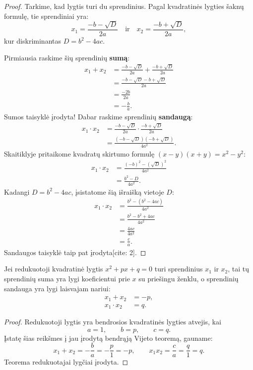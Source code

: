 \documentclass[11pt,a4paper]{scrartcl}
\begin{document}
\begin{proof}
Tarkime, kad lygtis turi du sprendinius. Pagal kvadratinės lygties šaknų formulę, tie sprendiniai yra:
\[ x_1 = \frac{-b - \sqrt{D}}{2a} \quad \text{ir} \quad x_2 = \frac{-b + \sqrt{D}}{2a}, \]
kur diskriminantas $D = b^2 - 4ac$.

Pirmiausia raskime šių sprendinių \textbf{sumą}:
\[
\begin{aligned}
x_1 + x_2 &= \frac{-b - \sqrt{D}}{2a} + \frac{-b + \sqrt{D}}{2a} \\
&= \frac{-b - \sqrt{D} - b + \sqrt{D}}{2a} \\
&= \frac{-2b}{2a} \\
&= -\frac{b}{a}.
\end{aligned}
\]
Sumos taisyklė įrodyta! Dabar raskime sprendinių \textbf{sandaugą}:
\[
\begin{aligned}
x_1 \cdot x_2 &= \frac{-b - \sqrt{D}}{2a} \cdot \frac{-b + \sqrt{D}}{2a} \\
&= \frac{(-b - \sqrt{D})(-b + \sqrt{D})}{4a^2}.
\end{aligned}
\]
Skaitiklyje pritaikome kvadratų skirtumo formulę $(x-y)(x+y) = x^2 - y^2$:
\[
\begin{aligned}
x_1 \cdot x_2 &= \frac{(-b)^2 - (\sqrt{D})^2}{4a^2} \\
&= \frac{b^2 - D}{4a^2}.
\end{aligned}
\]
Kadangi $D = b^2 - 4ac$, įsistatome šią išraišką vietoje $D$:
\[
\begin{aligned}
x_1 \cdot x_2 &= \frac{b^2 - (b^2 - 4ac)}{4a^2} \\
&= \frac{b^2 - b^2 + 4ac}{4a^2} \\
&= \frac{4ac}{4a^2} \\
&= \frac{c}{a}.
\end{aligned}
\]
Sandaugos taisyklė taip pat įrodyta[cite: 2].
\end{proof}

\begin{theorem}
Jei redukuotoji kvadratinė lygtis $x^2 + px + q = 0$ turi sprendinius $x_1$ ir $x_2$, tai tų sprendinių suma yra lygi koeficientui prie $x$ su priešingu ženklu, o sprendinių sandauga yra lygi laisvajam nariui:
\[
\begin{aligned}
x_1 + x_2 &= -p, \\
x_1 \cdot x_2 &= q.
\end{aligned}
\]
\end{theorem}

\begin{proof}
Redukuotoji lygtis yra bendrosios kvadratinės lygties atvejis, kai
\[
a=1, \qquad b=p, \qquad c=q.
\]
Įstatę šias reikšmes į jau įrodytą bendrąją Vijeto teoremą, gauname:
\[
x_1+x_2=-\frac{b}{a}=-\frac{p}{1}=-p,
\qquad
x_1x_2=\frac{c}{a}=\frac{q}{1}=q.
\]
Teorema redukuotajai lygčiai įrodyta.
\end{proof}
\end{document}
